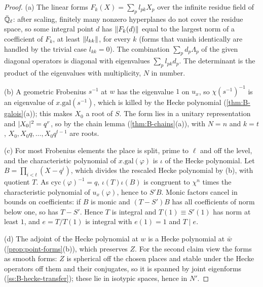 \begin{proof}
(a) The linear forms $F_k(X)=\sum_pl_{pk}X_p$ over the infinite residue field of $\bar{\mathbb{Q}}_\ell$: after scaling, finitely many nonzero hyperplanes do not cover the residue space, so some integral point $d$ has $\lVert F_k(d)\rVert$ equal to the largest norm of a
coefficient of $F_k$, at least $\lVert l_{kk}\rVert$, for every $k$ (forms that vanish identically are handled by the trivial case $l_{kk}=0$). The combination $\sum_pd_p\Lambda_p$ of the given diagonal operators is diagonal with eigenvalues $\sum_pl_{pk}d_p$. The
determinant is the product of the eigenvalues with multiplicity, $N$ in number.

(b) A geometric Frobenius $s^{-1}$ at $w$ has the eigenvalue $1$ on $u_x$, so $\chi(s^{-1})^{-1}$ is an eigenvalue of $x.\mathrm{gal}(s^{-1})$, which is killed by the Hecke polynomial (\cref{thm:B-galois}(a)); this makes $X_0$ a root of $S$. The form
lies in a unitary representation and $\lvert X_0\rvert^2=q^{r}$, so by the chain lemma (\cref{thm:B-chains}(a)), with $N=n$ and $k=t$, $X_0,X_0q,\dots,X_0q^{t-1}$ are roots.

(c) For most Frobenius elements the place is split, prime to $\ell$ and off the level, and the characteristic polynomial of $x.\mathrm{gal}(\varphi)$ is $\iota$ of the Hecke polynomial. Let $B=\prod_{i<t}(X-q^i)$, which divides the rescaled Hecke polynomial
by (b), with quotient $T$. As $\mathrm{cyc}(\varphi)^{-1}=q$, $\iota(T)\iota(B)$ is congruent to $\chi^n$ times the characteristic polynomial of $u_x(\varphi)$, hence to $S'B$. Monic factors cancel in bounds on coefficients: if $B$ is monic and $(T-S')B$ has all
coefficients of norm below one, so has $T-S'$. Hence $T$ is integral and $T(1)\equiv S'(1)$ has norm at least $1$, and $e=T/T(1)$ is integral with $e(1)=1$ and $T\mid e$.

(d) The adjoint of the Hecke polynomial at $w$ is a Hecke polynomial at $\bar w$ (\cref{prop:point-forms}(b)), which preserves $Z$. For the second claim view the forms as smooth forms: $Z$ is spherical off the chosen places and stable under the Hecke
operators off them and their conjugates, so it is spanned by joint eigenforms (\cref{ss:B-hecke-transfer}); these lie in isotypic spaces, hence in $N'$.
\end{proof}

